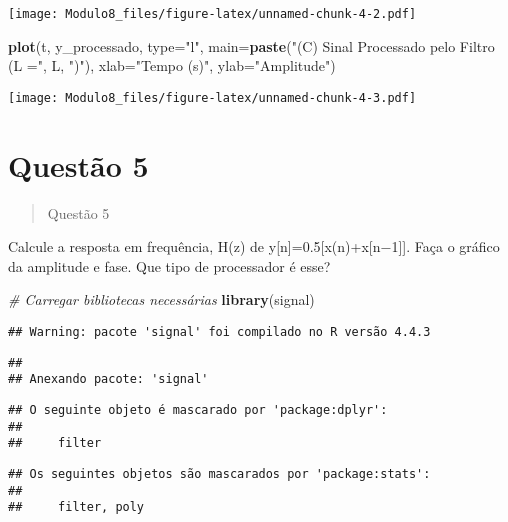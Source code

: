 \documentclass[
]{article}
\newenvironment{Shaded}{\begin{snugshade}}{\end{snugshade}}
\newcommand{\AttributeTok}[1]{\textcolor[rgb]{0.13,0.29,0.53}{#1}}
\newcommand{\CommentTok}[1]{\textcolor[rgb]{0.56,0.35,0.01}{\textit{#1}}}
\newcommand{\FunctionTok}[1]{\textcolor[rgb]{0.13,0.29,0.53}{\textbf{#1}}}
\newcommand{\NormalTok}[1]{#1}
\newcommand{\StringTok}[1]{\textcolor[rgb]{0.31,0.60,0.02}{#1}}
\begin{document}
\texttt{[image: Modulo8\_files/figure-latex/unnamed-chunk-4-2.pdf]}

\begin{Shaded}
\begin{Highlighting}[]
\FunctionTok{plot}\NormalTok{(t, y\_processado, }\AttributeTok{type=}\StringTok{"l"}\NormalTok{,}
     \AttributeTok{main=}\FunctionTok{paste}\NormalTok{(}\StringTok{"(C) Sinal Processado pelo Filtro (L ="}\NormalTok{, L, }\StringTok{")"}\NormalTok{),}
     \AttributeTok{xlab=}\StringTok{"Tempo (s)"}\NormalTok{, }\AttributeTok{ylab=}\StringTok{"Amplitude"}\NormalTok{)}
\end{Highlighting}
\end{Shaded}

\texttt{[image: Modulo8\_files/figure-latex/unnamed-chunk-4-3.pdf]}
\newpage

\section*{Questão 5}

\begin{quote}
Questão 5
\end{quote}

Calcule a resposta em frequência, H(z) de
y{[}n{]}=0.5{[}x(n)+x{[}n−1{]}{]}. Faça o gráfico da amplitude e fase.
Que tipo de processador é esse?

\begin{Shaded}
\begin{Highlighting}[]
\CommentTok{\# Carregar bibliotecas necessárias}
\FunctionTok{library}\NormalTok{(signal)}
\end{Highlighting}
\end{Shaded}

\begin{verbatim}
## Warning: pacote 'signal' foi compilado no R versão 4.4.3
\end{verbatim}

\begin{verbatim}
## 
## Anexando pacote: 'signal'
\end{verbatim}

\begin{verbatim}
## O seguinte objeto é mascarado por 'package:dplyr':
## 
##     filter
\end{verbatim}

\begin{verbatim}
## Os seguintes objetos são mascarados por 'package:stats':
## 
##     filter, poly
\end{verbatim}
\end{document}
